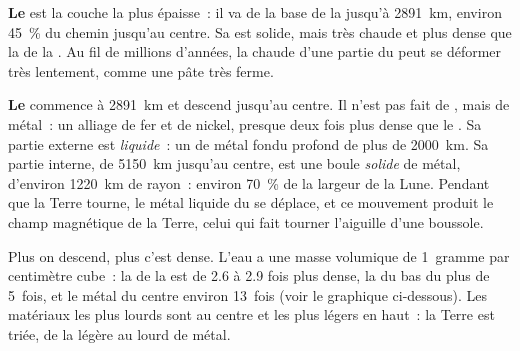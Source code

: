 \textbf{Le } est la couche la plus épaisse~: il va de la base de la
 jusqu'à 2891~km, environ 45~\% du chemin jusqu'au centre. Sa 
est solide, mais très chaude et plus dense que la  de la . Au
fil de millions d'années, la  chaude d'une partie du  peut se
déformer très lentement, comme une pâte très ferme.

\textbf{Le } commence à 2891~km et descend jusqu'au centre. Il n'est
pas fait de , mais de métal~: un alliage de fer et de nickel, presque
deux fois plus dense que le . Sa partie externe est
\emph{liquide}~: un  de métal fondu profond de plus de 2000~km. Sa
partie interne, de 5150~km jusqu'au centre, est une boule \emph{solide} de
métal, d'environ 1220~km de rayon~: environ 70~\% de la largeur de la Lune.
Pendant que la Terre tourne, le métal liquide du  se déplace,
et ce mouvement produit le champ magnétique de la Terre, celui qui fait
tourner l'aiguille d'une boussole.

Plus on descend, plus c'est dense. L'eau a une masse volumique de 1~gramme
par centimètre cube~: la  de la  est de 2.6 à 2.9 fois plus
dense, la  du bas du  plus de 5~fois, et le métal du centre
environ 13~fois (voir le graphique ci-dessous). Les matériaux les plus
lourds sont au centre et les plus légers en haut~: la Terre est triée, de
la  légère au lourd  de métal.


